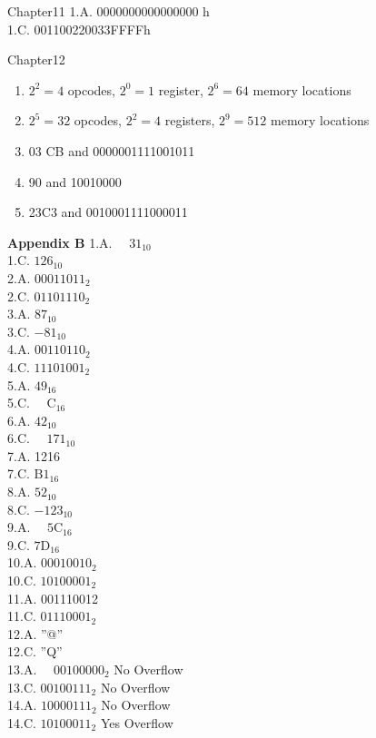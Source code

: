 \documentclass[10pt]{book}
\begin{document}
Chapter11
1.A. 0000000000000000 h\\
1.C. 001100220033FFFFh

Chapter12
\begin{enumerate}
  \item $2^{2}=4$ opcodes, $2^{0}=1$ register, $2^{6}=64$ memory locations
  \item $2^{5}=32$ opcodes, $2^{2}=4$ registers, $2^{9}=512$ memory locations
  \item 03 CB and 0000001111001011
  \item 90 and 10010000
  \item 23C3 and 0010001111000011
\end{enumerate}


\textbf{Appendix B}
1.A. $\quad 31_{10}$\\
1.C. $126_{10}$\\
2.A. $00011011_{2}$\\
2.C. $01101110_{2}$\\
3.A. $87_{10}$\\
3.C. $-81_{10}$\\
4.A. $00110110_{2}$\\
4.C. $11101001_{2}$\\
5.A. $49_{16}$\\
5.C. $\quad \mathrm{C}_{16}$\\
6.A. $42_{10}$\\
6.C. $\quad 171_{10}$\\
7.A. 1216\\
7.C. $\mathrm{B} 1_{16}$\\
8.A. $52_{10}$\\
8.C. $-123_{10}$\\
9.A. $\quad 5 \mathrm{C}_{16}$\\
9.C. $7 \mathrm{D}_{16}$\\
10.A. $00010010_{2}$\\
10.C. $10100001_{2}$\\
11.A. 001110012\\
11.C. $01110001_{2}$\\
12.A. ''@''\\
12.C. ''Q''\\
13.A. $\quad 00100000_{2}$ No Overflow\\
13.C. $00100111_{2}$ No Overflow\\
14.A. $10000111_{2}$ No Overflow\\
14.C. $10100011_{2}$ Yes Overflow\\
\end{document}
